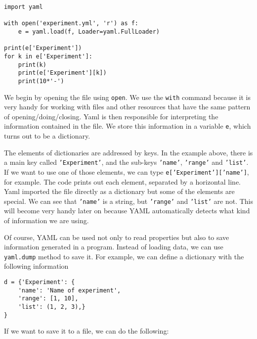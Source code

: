 \begin{verbatim}
import yaml

with open('experiment.yml', 'r') as f:
    e = yaml.load(f, Loader=yaml.FullLoader)

print(e['Experiment'])
for k in e['Experiment']:
    print(k)
    print(e['Experiment'][k])
    print(10*'-')
\end{verbatim}

We begin by opening the file using \texttt{open}. We use the \texttt{with} command because it is very handy for working with files and other resources that have the same pattern of opening/doing/closing. Yaml is then responsible for interpreting the information contained in the file. We store this information in a variable \texttt{e}, which turns out to be a dictionary. 

The elements of dictionaries are addressed by keys. In the example above, there is a main key called \texttt{'Experiment'}, and the sub-keys \texttt{'name'}, \texttt{'range'} and \texttt{'list'}. If we want to use one of those elements, we can type \texttt{e['Experiment']['name']}, for example. The code prints out each element, separated by a horizontal line. Yaml imported the file directly as a dictionary but some of the elements are special. We can see that \texttt{'name'} is a string, but \texttt{'range'} and \texttt{'list'} are not. This will become very handy later on because YAML automatically detects what kind of information we are using. 



Of course, YAML can be used not only to read properties but also to save information generated in a program. Instead of loading data, we can use \texttt{yaml.dump} method to save it. For example, we can define a dictionary with the following information

\begin{verbatim}
d = {'Experiment': {
    'name': 'Name of experiment',
    'range': [1, 10],
    'list': (1, 2, 3),}
}
\end{verbatim}

If we want to save it to a file, we can do the following:

